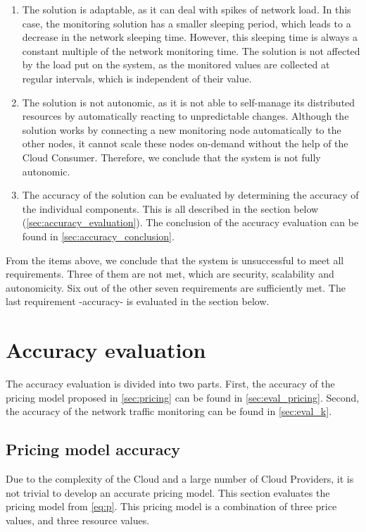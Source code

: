\begin{enumerate}
    \item The solution is adaptable, as it can deal with spikes of network load. In this case, the monitoring solution has a smaller sleeping period, which leads to a decrease in the network sleeping time. However, this sleeping time is always a constant multiple of the network monitoring time. The solution is not affected by the load put on the system, as the monitored values are collected at regular intervals, which is independent of their value.
    \item The solution is not autonomic, as it is not able to self-manage its distributed resources by automatically reacting to unpredictable changes. Although the solution works by connecting a new monitoring node automatically to the other nodes, it cannot scale these nodes on-demand without the help of the Cloud Consumer. Therefore, we conclude that the system is not fully autonomic.
    \item The accuracy of the solution can be evaluated by determining the accuracy of the individual components. This is all described in the section below (\autoref{sec:accuracy_evaluation}). The conclusion of the accuracy evaluation can be found in \autoref{sec:accuracy_conclusion}.
\end{enumerate}

\noindent
From the items above, we conclude that the system is unsuccessful to meet all requirements. Three of them are not met, which are security, scalability and autonomicity. Six out of the other seven requirements are sufficiently met. The last requirement -accuracy- is evaluated in the section below.

\section{Accuracy evaluation} \label{sec:accuracy_evaluation}
The accuracy evaluation is divided into two parts. First, the accuracy of the pricing model proposed in \autoref{sec:pricing} can be found in \autoref{sec:eval_pricing}. Second, the accuracy of the network traffic monitoring can be found in \autoref{sec:eval_k}.

\subsection{Pricing model accuracy} \label{sec:eval_pricing}
Due to the complexity of the Cloud and a large number of Cloud Providers, it is not trivial to develop an accurate pricing model. This section evaluates the pricing model from \autoref{eq:p}. This pricing model is a combination of three price values, and three resource values.\\

